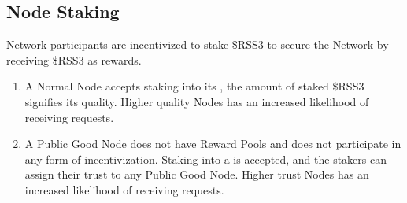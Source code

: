 \subsection{Node Staking}
Network participants are incentivized to stake \$RSS3 to secure the Network by receiving \$RSS3 as rewards.
\begin{enumerate}
    \item A Normal Node accepts staking into its \stakingPool, the amount of staked \$RSS3 signifies its quality. Higher quality Nodes has an increased likelihood of receiving requests.
    \item A Public Good Node does not have Reward Pools and does not participate in any form of incentivization. Staking into a  is accepted, and the stakers can assign their trust to any Public Good Node. Higher trust Nodes has an increased likelihood of receiving requests.
\end{enumerate}


